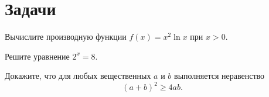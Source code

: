 \section*{Задачи}

\begin{exercise}
Вычислите производную функции $f(x) = x^2 \ln x$ при $x > 0$.
\end{exercise}

\begin{exercise}
Решите уравнение $2^x = 8$.
\answerbox[2.5cm]
\end{exercise}

\begin{exercise}
Докажите, что для любых вещественных $a$ и $b$ выполняется неравенство
\[
  (a + b)^2 \geq 4ab.
\]
\end{exercise}
